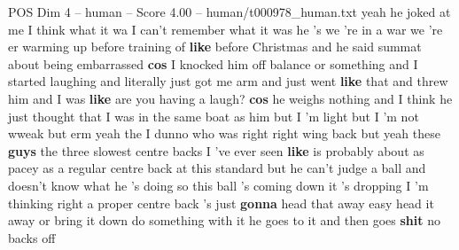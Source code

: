 \begin{textsample}{POS Dim 4 – human – Score 4.00 – human/t000978\_human.txt}  \label{ex:f4_pos_010}
yeah he joked at me I think what it wa I can't remember what it was he 's we 're in a war we 're er warming up before training of \textbf{like} before Christmas and he said summat about being embarrassed \textbf{cos} I knocked him off balance or something and I started laughing and literally just got me arm and just went \textbf{like} that and threw him and I was \textbf{like} are you having a laugh? \textbf{cos} he weighs nothing and I think he just thought that I was in the same boat as him but I 'm light but I 'm not wweak but erm yeah the I dunno who was right right wing back but yeah these \textbf{guys} the three slowest centre backs I 've ever seen \textbf{like} is probably about as pacey as a regular centre back at this standard but he can't judge a ball and doesn't know what he 's doing so this ball 's coming down it 's dropping I 'm thinking right a proper centre back 's just \textbf{gonna} head that away easy head it away or bring it down do something with it he goes to it and then goes \textbf{shit} no backs off

\end{textsample}
